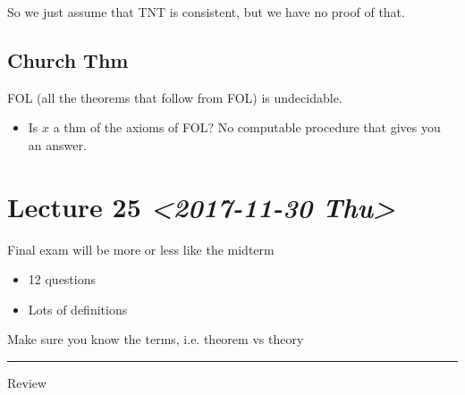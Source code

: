 \documentclass[11pt]{article}
\begin{document}
So we just assume that TNT is consistent, but we have no proof of that.
\subsection{Church Thm}
\label{sec:orgf07b56a}
FOL (all the theorems that follow from FOL) is undecidable.
\begin{itemize}
\item Is \(x\) a thm of the axioms of FOL? No computable procedure that gives you an answer.
\end{itemize}
\section{Lecture 25 \textit{<2017-11-30 Thu>}}
\label{sec:orga082d38}
Final exam will be more or less like the midterm
\begin{itemize}
\item 12 questions
\item Lots of definitions
\end{itemize}
Make sure you know the terms, i.e. theorem vs theory

\noindent\rule{\textwidth}{0.5pt}
Review
\end{document}
